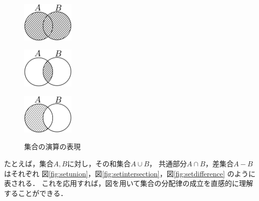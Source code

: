    \begin{figure}[h]
     \begin{minipage}{0.3\linewidth}
       \centering
       \includegraphics[width=2.5cm]{inputyou/set/picture/setunion.pdf}
        \label{fig:setunion}
     \end{minipage}
     \begin{minipage}{0.3\linewidth}
       \centering
       \includegraphics[width=2.5cm]{inputyou/set/picture/setintersection.pdf}
        \label{fig:setintersection}
     \end{minipage}
     \begin{minipage}{0.3\linewidth}
       \centering
       \includegraphics[width=2.5cm]{inputyou/set/picture/setvenndia.pdf}
        \label{fig:setdifference}
     \end{minipage}
     \caption{集合の演算の表現}
     \label{fig:setenzan}
   \end{figure}
   たとえば，集合$A,  B$に対し，その和集合$A \cup B$，
   共通部分$A \cap B$，差集合$A -B$はそれぞれ
   図\ref{fig:setunion}，図\ref{fig:setintersection}，図\ref{fig:setdifference}
   のように表される．
   これを応用すれば，図を用いて集合の分配律の成立を直感的に理解することができる．
